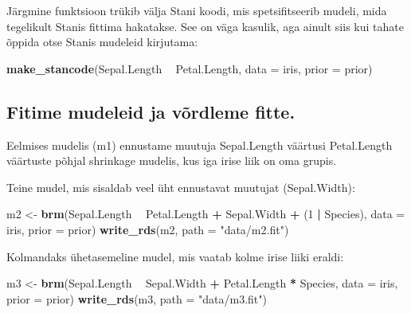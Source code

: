 \documentclass[]{book}
\newenvironment{Shaded}{\begin{snugshade}}{\end{snugshade}}
\newcommand{\KeywordTok}[1]{\textcolor[rgb]{0.13,0.29,0.53}{\textbf{#1}}}
\newcommand{\DataTypeTok}[1]{\textcolor[rgb]{0.13,0.29,0.53}{#1}}
\newcommand{\DecValTok}[1]{\textcolor[rgb]{0.00,0.00,0.81}{#1}}
\newcommand{\StringTok}[1]{\textcolor[rgb]{0.31,0.60,0.02}{#1}}
\newcommand{\OperatorTok}[1]{\textcolor[rgb]{0.81,0.36,0.00}{\textbf{#1}}}
\newcommand{\NormalTok}[1]{#1}
\begin{document}
Järgmine funktsioon trükib välja Stani koodi, mis spetsifitseerib
mudeli, mida tegelikult Stanis fittima hakatakse. See on väga kasulik,
aga ainult siis kui tahate õppida otse Stanis mudeleid kirjutama:

\begin{Shaded}
\begin{Highlighting}[]
\KeywordTok{make_stancode}\NormalTok{(Sepal.Length }\OperatorTok{~}\StringTok{ }\NormalTok{Petal.Length, }\DataTypeTok{data =}\NormalTok{ iris, }\DataTypeTok{prior =}\NormalTok{ prior)}
\end{Highlighting}
\end{Shaded}

\subsection{Fitime mudeleid ja võrdleme
fitte.}\label{fitime-mudeleid-ja-vordleme-fitte.}

Eelmises mudelis (m1) ennustame muutuja Sepal.Length väärtusi
Petal.Length väärtuste põhjal shrinkage mudelis, kus iga irise liik on
oma grupis.

Teine mudel, mis sisaldab veel üht ennustavat muutujat (Sepal.Width):

\begin{Shaded}
\begin{Highlighting}[]
\NormalTok{m2 <-}\StringTok{ }\KeywordTok{brm}\NormalTok{(Sepal.Length }\OperatorTok{~}\StringTok{ }\NormalTok{Petal.Length }\OperatorTok{+}\StringTok{ }\NormalTok{Sepal.Width }\OperatorTok{+}\StringTok{ }\NormalTok{(}\DecValTok{1} \OperatorTok{|}\StringTok{ }\NormalTok{Species), }
          \DataTypeTok{data =}\NormalTok{ iris, }
          \DataTypeTok{prior =}\NormalTok{ prior)}
\KeywordTok{write_rds}\NormalTok{(m2, }\DataTypeTok{path =} \StringTok{"data/m2.fit"}\NormalTok{)}
\end{Highlighting}
\end{Shaded}

Kolmandaks ühetasemeline mudel, mis vaatab kolme irise liiki eraldi:

\begin{Shaded}
\begin{Highlighting}[]
\NormalTok{m3 <-}\StringTok{ }\KeywordTok{brm}\NormalTok{(Sepal.Length }\OperatorTok{~}\StringTok{ }\NormalTok{Sepal.Width }\OperatorTok{+}\StringTok{ }\NormalTok{Petal.Length }\OperatorTok{*}\StringTok{ }\NormalTok{Species, }
          \DataTypeTok{data =}\NormalTok{ iris, }
          \DataTypeTok{prior =}\NormalTok{ prior)}
\KeywordTok{write_rds}\NormalTok{(m3, }\DataTypeTok{path =} \StringTok{"data/m3.fit"}\NormalTok{)}
\end{Highlighting}
\end{Shaded}
\end{document}
